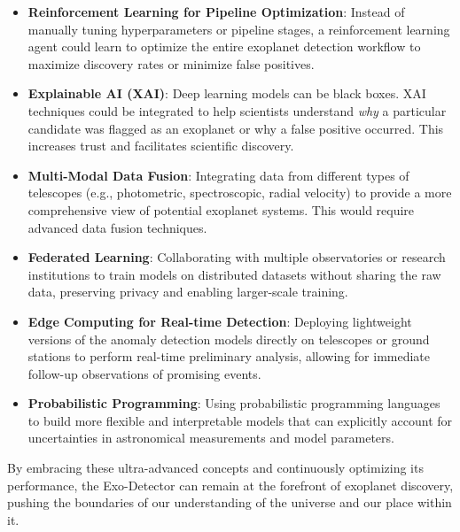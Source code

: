 \documentclass{article}
\begin{document}
\begin{itemize}
    \item \textbf{Reinforcement Learning for Pipeline Optimization}: Instead of manually tuning hyperparameters or pipeline stages, a reinforcement learning agent could learn to optimize the entire exoplanet detection workflow to maximize discovery rates or minimize false positives.
    \item \textbf{Explainable AI (XAI)}: Deep learning models can be black boxes. XAI techniques could be integrated to help scientists understand \textit{why} a particular candidate was flagged as an exoplanet or why a false positive occurred. This increases trust and facilitates scientific discovery.
    \item \textbf{Multi-Modal Data Fusion}: Integrating data from different types of telescopes (e.g., photometric, spectroscopic, radial velocity) to provide a more comprehensive view of potential exoplanet systems. This would require advanced data fusion techniques.
    \item \textbf{Federated Learning}: Collaborating with multiple observatories or research institutions to train models on distributed datasets without sharing the raw data, preserving privacy and enabling larger-scale training.
    \item \textbf{Edge Computing for Real-time Detection}: Deploying lightweight versions of the anomaly detection models directly on telescopes or ground stations to perform real-time preliminary analysis, allowing for immediate follow-up observations of promising events.
    \item \textbf{Probabilistic Programming}: Using probabilistic programming languages to build more flexible and interpretable models that can explicitly account for uncertainties in astronomical measurements and model parameters.
\end{itemize}

By embracing these ultra-advanced concepts and continuously optimizing its performance, the Exo-Detector can remain at the forefront of exoplanet discovery, pushing the boundaries of our understanding of the universe and our place within it.
\end{document}
